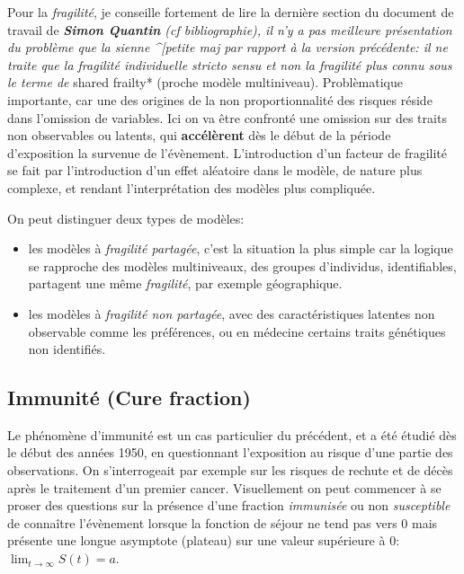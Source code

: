 \documentclass[
  12pt,
  letterpaper,
  DIV=11,
  numbers=noendperiod,
  onepage,
  openany]{scrreprt}
\providecommand{\tightlist}{%
  \setlength{\itemsep}{0pt}\setlength{\parskip}{0pt}}\usepackage{longtable,booktabs,array}
\begin{document}
Pour la \emph{fragilité}, je conseille fortement de lire la dernière
section du document de travail de \emph{\textbf{Simon Quantin} (cf
bibliographie), il n'y a pas meilleure présentation du problème que la
sienne \^{}{[}petite maj par rapport à la version précédente: il ne
traite que la fragilité individuelle stricto sensu et non la fragilité
plus connu sous le terme de }shared frailty* (proche modèle
multiniveau). Problèmatique importante, car une des origines de la non
proportionnalité des risques réside dans l'omission de variables. Ici on
va être confronté une omission sur des traits non observables ou
latents, qui \textbf{accélèrent} dès le début de la période d'exposition
la survenue de l'évènement. L'introduction d'un facteur de fragilité se
fait par l'introduction d'un effet aléatoire dans le modèle, de nature
plus complexe, et rendant l'interprétation des modèles plus compliquée.

On peut distinguer deux types de modèles:

\begin{itemize}
\tightlist
\item
  les modèles à \emph{fragilité partagée}, c'est la situation la plus
  simple car la logique se rapproche des modèles multiniveaux, des
  groupes d'individus, identifiables, partagent une même
  \emph{fragilité}, par exemple géographique.
\item
  les modèles à \emph{fragilité non partagée}, avec des caractéristiques
  latentes non observable comme les préférences, ou en médecine certains
  traits génétiques non identifiés.
\end{itemize}

\hypertarget{immunituxe9-cure-fraction}{%
\subsection{Immunité (Cure fraction)}\label{immunituxe9-cure-fraction}}

Le phénomène d'immunité est un cas particulier du précédent, et a été
étudié dès le début des années 1950, en questionnant l'exposition au
risque d'une partie des observations. On s'interrogeait par exemple sur
les risques de rechute et de décès après le traitement d'un premier
cancer. Visuellement on peut commencer à se proser des questions sur la
présence d'une fraction \emph{immunisée} ou non \emph{susceptible} de
connaître l'évènement lorsque la fonction de séjour ne tend pas vers 0
mais présente une longue asymptote (plateau) sur une valeur supérieure à
0: \(\lim_{t \to \infty}S(t)=a\).
\end{document}
